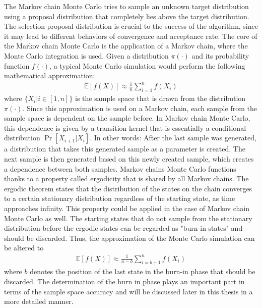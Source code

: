 The Markov chain Monte Carlo tries to sample an unknown target distribution using a proposal distribution that completely lies above the target distribution. The selection proposal distribution is crucial to the success of the algorithm, since it may lead to different behaviors of convergence and acceptance rate.\cite{mcmc_handbook} The core of the Markov chain Monte Carlo is the application of a Markov chain, where the Monte Carlo integration is used. Given a distribution $\pi(\cdot)$ and its probability function $f(\cdot)$, a typical Monte Carlo simulation would perform the following mathematical approximation:
\begin{align}
\mathbb{E}[f(X)] \approx \frac{1}{n}\sum_{i=1}^{n}f(X_i)
\end{align}
where $\{X_i | i\in[1, n]\}$ is the sample space that is drawn from the distribution $\pi(\cdot)$.\cite{mcmc_practice} Since this approximation is used on a Markov chain, each sample from the sample space is dependent on the sample before. In Markov chain Monte Carlo, this dependence is given by a transition kernel that is essentially a conditional distribution $\Pr[X_{i+1}|X_i]$.\cite{mcmc_practice} In other words: After the last sample was generated, a distribution that takes this generated sample as a parameter is created. The next sample is then generated based on this newly created sample, which creates a dependence between both samples. Markov chains Monte Carlo functions thanks to a property called ergodicity that is shared by all Markov chains. The ergodic theorem states that the distribution of the states on the chain converges to a certain stationary distribution regardless of the starting state, as time approaches infinity.\cite{ergodicity} This property could be applied in the case of Markov chain Monte Carlo as well. The starting states that do not sample from the stationary distribution before the ergodic states can be regarded as "burn-in states" and should be discarded. Thus, the approximation of the Monte Carlo simulation can be altered to
\begin{align}
\mathbb{E}[f(X)] \approx \frac{1}{n-b}\sum_{i=b + 1}^{n}f(X_i)
\end{align}
where $b$ denotes the position of the last state in the burn-in phase that should be discarded\cite{mcmc_practice}. The determination of the burn in phase plays an important part in terms of the sample space accuracy and will be discussed later in this thesis in a more detailed manner.

